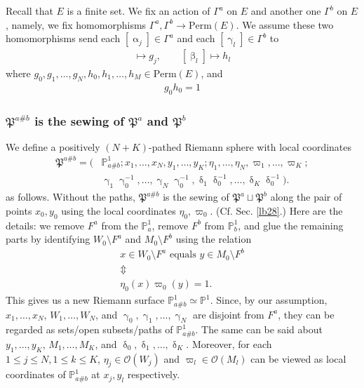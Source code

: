 \documentclass[11pt,b5paper,notitlepage]{article}
\theoremstyle{definition}
\theoremstyle{plain}
\newcommand{\fk}{\mathfrak}
\newcommand{\scr}{\mathscr}
\newcommand{\Pbb}{\mathbb P}
\newcommand{\Perm}{\mathrm{Perm}}
\numberwithin{equation}{subsection}
\begin{document}
Recall that $E$ is a finite set.  We fix an action of $\Gamma^a$ on $E$ and another one $\Gamma^b$ on $E$, namely, we fix homomorphisms $\Gamma^a,\Gamma^b\rightarrow\Perm(E)$. We assume these two homomorphisms send each $[\upalpha_j]\in\Gamma^a$ and each $[\upgamma_l]\in\Gamma^b$ to
\begin{align*}
[\upalpha_j]\mapsto g_j,\qquad [\upbeta_l]\mapsto h_l	
\end{align*}
where $g_0,g_1,\dots,g_N,h_0,h_1,\dots,h_M\in\Perm(E)$, and 
\begin{align}\label{eq55}
\boxed{~g_0h_0=1~}
\end{align}


\subsubsection{$\fk P^{a\#b}$ is the sewing of $\fk P^a$ and $\fk P^b$}\label{lb60}

We define a positively $(N+K)$-pathed Riemann sphere with local coordinates
\begin{align*}
\fk P^{a\#b}=\big(&\Pbb^1_{a\#b};x_1,\dots,x_N,y_1,\dots,y_K;\eta_1,\dots,\eta_N,\varpi_1,\dots,\varpi_K;\nonumber\\
&\upgamma_1\upgamma_0^{-1},\dots,\upgamma_N\upgamma_0^{-1},\updelta_1\updelta_0^{-1},\dots,\updelta_K\updelta_0^{-1}\big).	
\end{align*}
as follows. Without the paths, $\fk P^{a\#b}$ is the sewing of $\fk P^a\sqcup\fk P^b$ along the pair of points $x_0,y_0$ using the local coordinates $\eta_0,\varpi_0$. (Cf. Sec. \ref{lb28}.) Here are the details: we remove $F^a$ from the $\Pbb^1_a$, remove $F^b$ from $\Pbb^1_b$, and glue the remaining parts by identifying $W_0\setminus F^a$ and $M_0\setminus F^b$ using the relation
\begin{gather*}
x\in W_0\setminus F^a\text{ equals }y\in M_0\setminus F^b\\
\Updownarrow\\
\eta_0(x)\varpi_0(y)=1.
\end{gather*}
This gives us a new Riemann surface $\Pbb^1_{a\#b}\simeq\Pbb^1$. Since, by our assumption, $x_1,\dots,x_N$, $W_1,\dots,W_N$, and $\upgamma_0,\upgamma_1,\dots,\upgamma_N$ are disjoint from $F^a$, they can be regarded as sets/open subsets/paths of $\Pbb^1_{a\#b}$. The same can be said about $y_1,\dots,y_K$, $M_1,\dots,M_K$, and $\updelta_0,\updelta_1,\dots,\updelta_K$. Moreover, for each $1\leq j\leq N,1\leq k\leq K$, $\eta_j\in\scr O(W_j)$ and $\varpi_l\in\scr O(M_l)$ can be viewed as local coordinates of $\Pbb^1_{a\#b}$ at $x_j,y_l$ respectively.
\end{document}
